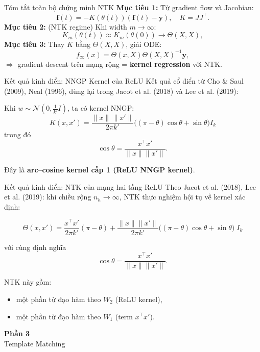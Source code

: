 \begin{frame}{Tóm tắt toàn bộ chứng minh NTK}
     \textbf{Mục tiêu 1:}  
          Từ gradient flow và Jacobian:
          \[
            \dot{\mathbf f}(t)
            = -K(\theta(t))(\mathbf f(t)-\mathbf y),
            \quad K = JJ^\top.
          \]
     \textbf{Mục tiêu 2:} (NTK regime)  
          Khi width $m\to\infty$:
          \[
            K_m(\theta(t)) \approx K_m(\theta(0)) \to \Theta(X,X),
          \]
     \textbf{Mục tiêu 3:}  
          Thay $K$ bằng $\Theta(X,X)$, giải ODE:
          \[
            f_\infty(x)
            = \Theta(x,X)\Theta(X,X)^{-1}\mathbf y,
          \]
          $\Rightarrow$ gradient descent trên mạng rộng = \textbf{kernel regression} với NTK.
\end{frame}

\begin{frame}{Kết quả kinh điển: NNGP Kernel của ReLU}
Kết quả cổ điển từ Cho \& Saul (2009), Neal (1996), dùng lại trong
Jacot et al. (2018) và Lee et al. (2019):

\vspace{0.2cm}
Khi $w \sim \mathcal N(0,\tfrac{1}{k'}I)$, ta có kernel NNGP:
\[
K(x,x')
=
\frac{\|x\|\,\|x'\|}{2\pi k'}
\Big(
(\pi - \theta)\cos\theta + \sin\theta
\Big)
I_k
\]
trong đó
\[
\cos\theta
=
\frac{x^\top x'}{\|x\|\|x'\|}.
\]

\vspace{0.2cm}
Đây là \textbf{arc--cosine kernel cấp 1 (ReLU NNGP kernel)}.
\end{frame}

\begin{frame}{Kết quả kinh điển: NTK của mạng hai tầng ReLU}
Theo Jacot et al. (2018), Lee et al. (2019):
khi chiều rộng $n_h \to \infty$, NTK thực nghiệm hội tụ về
kernel xác định:

\[
\Theta(x,x')
=
\frac{x^\top x'}{2\pi k'}(\pi - \theta)
+
\frac{\|x\|\|x'\|}{2\pi k'}
\Big(
(\pi - \theta)\cos\theta + \sin\theta
\Big)
\; I_k
\]

với cùng định nghĩa
\[
\cos\theta = \frac{x^\top x'}{\|x\|\|x'\|}.
\]

\vspace{0.2cm}
NTK này gồm:
\begin{itemize}
    \item một phần từ đạo hàm theo $W_2$ (ReLU kernel),
    \item một phần từ đạo hàm theo $W_1$ (term $x^\top x'$).
\end{itemize}
\end{frame}

\begin{frame}{}
  \centering
  \vfill
  {\Huge \textbf{Phần 3}}\\[0.5cm]
  {\Large Template Matching}
  \vfill
\end{frame}
